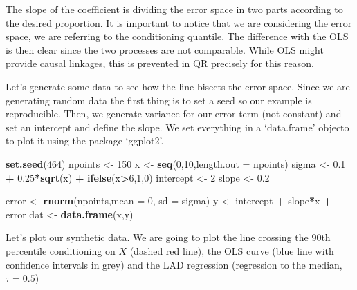 \documentclass[]{book}
\newenvironment{Shaded}{\begin{snugshade}}{\end{snugshade}}
\newcommand{\KeywordTok}[1]{\textcolor[rgb]{0.13,0.29,0.53}{\textbf{#1}}}
\newcommand{\DataTypeTok}[1]{\textcolor[rgb]{0.13,0.29,0.53}{#1}}
\newcommand{\DecValTok}[1]{\textcolor[rgb]{0.00,0.00,0.81}{#1}}
\newcommand{\FloatTok}[1]{\textcolor[rgb]{0.00,0.00,0.81}{#1}}
\newcommand{\StringTok}[1]{\textcolor[rgb]{0.31,0.60,0.02}{#1}}
\newcommand{\OperatorTok}[1]{\textcolor[rgb]{0.81,0.36,0.00}{\textbf{#1}}}
\newcommand{\NormalTok}[1]{#1}
\begin{document}
The slope of the coefficient is dividing the error space in two parts
according to the desired proportion. It is important to notice that we
are considering the error space, we are referring to the conditioning
quantile. The difference with the OLS is then clear since the two
processes are not comparable. While OLS might provide causal linkages,
this is prevented in QR precisely for this reason.

Let's generate some data to see how the line bisects the error space.
Since we are generating random data the first thing is to set a seed so
our example is reproducible. Then, we generate variance for our error
term (not constant) and set an intercept and define the slope. We set
everything in a `data.frame' objecto to plot it using the package
`ggplot2'\citep{R-ggplot2}.

\begin{Shaded}
\begin{Highlighting}[]
\KeywordTok{set.seed}\NormalTok{(}\DecValTok{464}\NormalTok{)}
\NormalTok{npoints <-}\StringTok{ }\DecValTok{150}
\NormalTok{x <-}\StringTok{ }\KeywordTok{seq}\NormalTok{(}\DecValTok{0}\NormalTok{,}\DecValTok{10}\NormalTok{,}\DataTypeTok{length.out =}\NormalTok{ npoints)        }
\NormalTok{sigma <-}\StringTok{ }\FloatTok{0.1} \OperatorTok{+}\StringTok{ }\FloatTok{0.25}\OperatorTok{*}\KeywordTok{sqrt}\NormalTok{(x) }\OperatorTok{+}\StringTok{ }\KeywordTok{ifelse}\NormalTok{(x}\OperatorTok{>}\DecValTok{6}\NormalTok{,}\DecValTok{1}\NormalTok{,}\DecValTok{0}\NormalTok{)                    }
\NormalTok{intercept <-}\StringTok{ }\DecValTok{2}
\NormalTok{slope <-}\StringTok{ }\FloatTok{0.2}

\NormalTok{error <-}\StringTok{ }\KeywordTok{rnorm}\NormalTok{(npoints,}\DataTypeTok{mean =} \DecValTok{0}\NormalTok{, }\DataTypeTok{sd =}\NormalTok{ sigma)      }
\NormalTok{y <-}\StringTok{ }\NormalTok{intercept }\OperatorTok{+}\StringTok{ }\NormalTok{slope}\OperatorTok{*}\NormalTok{x }\OperatorTok{+}\StringTok{ }\NormalTok{error                    }
\NormalTok{dat <-}\StringTok{ }\KeywordTok{data.frame}\NormalTok{(x,y)}
\end{Highlighting}
\end{Shaded}

Let's plot our synthetic data. We are going to plot the line crossing
the 90th percentile conditioning on \(X\) (dashed red line), the OLS
curve (blue line with confidence intervals in grey) and the LAD
regression (regression to the median, \(\tau = 0.5\))
\end{document}
